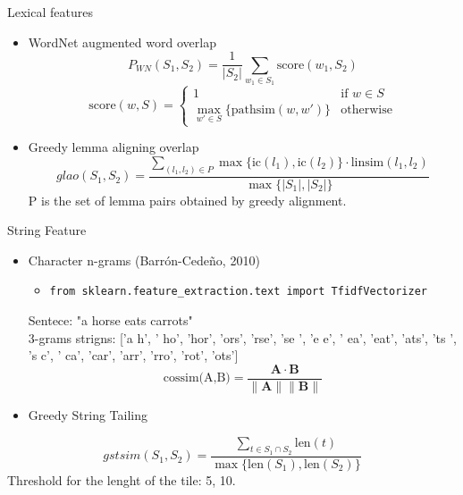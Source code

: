 \begin{frame}{Lexical features}
    \begin{itemize}
    \item WordNet augmented word overlap 
    \[ P_{WN}(S_1, S_2) = \frac{1}{|S_2|} \sum_{w_1 \in S_1} \text{score}(w_1, S_2)\]
    \[
    \text{score}(w, S) = 
    \begin{cases} 
    1 & \text{if } w \in S \\ 
    \max_{w' \in S} \{\text{pathsim}(w, w')\} & \text{otherwise}
    \end{cases}
    \]
    \vspace{0.3cm}
\item Greedy lemma aligning overlap
    \[ glao(S_1, S_2) = \frac{\sum_{(l_1, l_2) \in P} \max \{ \text{ic}(l_1), \text{ic}(l_2) \} \cdot \text{linsim}(l_1, l_2)}{\max \{|S_1|, |S_2|\}} \]
    P is the set of lemma pairs obtained by greedy alignment.
\end{itemize}
\end{frame}

\begin{frame}{String Feature}

    \begin{itemize}
        \item Character n-grams (Barrón-Cedeño, 2010)
        \vspace{0.2cm}
        \begin{itemize}
            \item \texttt{from sklearn.feature\_extraction.text import TfidfVectorizer} 
        \end{itemize}
        \vspace{0.2cm} 
        Sentece: "a horse eats carrots" \\ \vspace{0.2cm}
        3-grams strigns: ['a h', ' ho', 'hor', 'ors', 'rse', 'se ', 'e e', ' ea', 'eat', 'ats', 'ts ', 's c', ' ca', 'car', 'arr', 'rro', 'rot', 'ots']
        \[ 
            \text{cossim(A,B)} = \frac{\mathbf{A} \cdot \mathbf{B}}{\|\mathbf{A}\| \|\mathbf{B}\|}
             \]
    \end{itemize}

    \begin{itemize}
        \item Greedy String Tailing
    \end{itemize}
    \[
gstsim(S_1, S_2) = \frac{\sum_{t \in S_1 \cap S_2} \text{len}(t)}{\max \{ \text{len}(S_1), \text{len}(S_2) \}}
\]
        Threshold for the lenght of the tile: 5, 10. \\ \vspace{0.1cm}
\end{frame}

